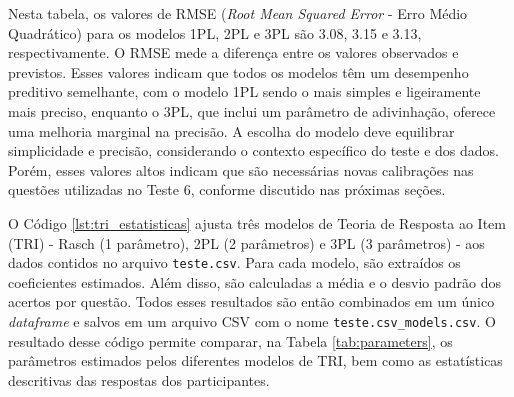Nesta tabela, os valores de RMSE (\textit{Root Mean Squared Error} - Erro Médio Quadrático) para os modelos 1PL, 2PL e 3PL são 3.08, 3.15 e 3.13, respectivamente.  O RMSE mede a diferença entre os valores observados e previstos.  Esses valores indicam que todos os modelos têm um desempenho preditivo semelhante, com o modelo 1PL sendo o mais simples e ligeiramente mais preciso, enquanto o 3PL, que inclui um parâmetro de adivinhação, oferece uma melhoria marginal na precisão. A escolha do modelo deve equilibrar simplicidade e precisão, considerando o contexto específico do teste e dos dados. Porém, esses valores altos indicam que são necessárias novas calibrações nas questões utilizadas no Teste 6, conforme discutido nas próximas seções.

O Código \ref{lst:tri_estatisticas} ajusta três modelos de Teoria de Resposta ao Item (TRI) - Rasch (1 parâmetro), 2PL (2 parâmetros) e 3PL (3 parâmetros) - aos dados contidos no arquivo \verb|teste.csv|. Para cada modelo, são extraídos os coeficientes estimados. Além disso, são calculadas a média e o desvio padrão dos acertos por questão. Todos esses resultados são então combinados em um único \textit{dataframe} e salvos em um arquivo CSV com o nome \verb|teste.csv_models.csv|. O resultado desse código permite comparar, na Tabela \ref{tab:parameters}, os parâmetros estimados pelos diferentes modelos de TRI, bem como as estatísticas descritivas das respostas dos participantes.



